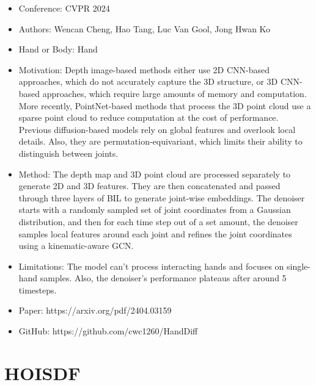 \documentclass{article}
\begin{document}
\begin{itemize}
    \item Conference: CVPR 2024
    \item Authors: Wencan Cheng, Hao Tang, Luc Van Gool, Jong Hwan Ko
    \item Hand or Body: Hand
    \item Motivation: Depth image-based methods either use 2D CNN-based approaches, which do not accurately capture the 3D structure, or 3D CNN-based approaches, which require large amounts of memory and computation. More recently, PointNet-based methods that process the 3D point cloud use a sparse point cloud to reduce computation at the cost of performance. Previous diffusion-based models rely on global features and overlook local details. Also, they are permutation-equivariant, which limits their ability to distinguish between joints.
    \item Method: The depth map and 3D point cloud are processed separately to generate 2D and 3D features. They are then concatenated and passed through three layers of BIL to generate joint-wise embeddings. The denoiser starts with a randomly sampled set of joint coordinates from a Gaussian distribution, and then for each time step out of a set amount, the denoiser samples local features around each joint and refines the joint coordinates using a kinematic-aware GCN.
    \item Limitations: The model can't process interacting hands and focuses on single-hand samples. Also, the denoiser's performance plateaus after around 5 timesteps.
    \item Paper: https://arxiv.org/pdf/2404.03159
    \item GitHub: https://github.com/cwc1260/HandDiff
\end{itemize}

\section*{HOISDF}
\end{document}
